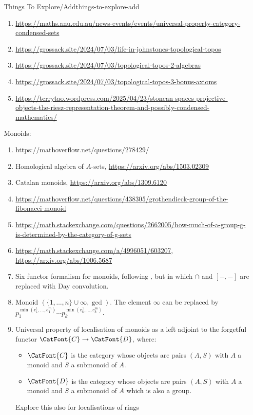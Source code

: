 \begin{remark}{Things To Explore/Add}{things-to-explore-add}
\begin{enumerate}
        \item \url{https://maths.anu.edu.au/news-events/events/universal-property-category-condensed-sets}
        \item \url{https://grossack.site/2024/07/03/life-in-johnstones-topological-topos}
        \item \url{https://grossack.site/2024/07/03/topological-topos-2-algebras}
        \item \url{https://grossack.site/2024/07/03/topological-topos-3-bonus-axioms}
        \item \url{https://terrytao.wordpress.com/2025/04/23/stonean-spaces-projective-objects-the-riesz-representation-theorem-and-possibly-condensed-mathematics/}
    \end{enumerate}
    Monoids:
    \begin{enumerate}
        \item \url{https://mathoverflow.net/questions/278429/}
        \item Homological algebra of $A$-sets, \url{https://arxiv.org/abs/1503.02309}
        \item Catalan monoids, \url{https://arxiv.org/abs/1309.6120}
        \item \url{https://mathoverflow.net/questions/438305/grothendieck-group-of-the-fibonacci-monoid}
        \item \url{https://math.stackexchange.com/questions/2662005/how-much-of-a-group-g-is-determined-by-the-category-of-g-sets}
        \item \url{https://math.stackexchange.com/a/4996051/603207}, \url{https://arxiv.org/abs/1006.5687}
        \item Six functor formalism for monoids, following , but in which $\cap$ and $[-,-]$ are replaced with Day convolution.
        \item Monoid $(\{1,\ldots,n\}\cup\infty,\gcd)$. The element $\infty$ can be replaced by $p^{\min(e^{1}_{1},\ldots,e^{m}_{1})}_{1}\cdots p^{\min(e^{1}_{k},\ldots,e^{m}_{k})}_{k}$.
        \item Universal property of localisation of monoids as a left adjoint to the forgetful functor $\CatFont{C}\to\CatFont{D}$, where:
            \begin{itemize}
                \item $\CatFont{C}$ is the category whose objects are pairs $(A,S)$ with $A$ a monoid and $S$ a submonoid of $A$.
                \item $\CatFont{D}$ is the category whose objects are pairs $(A,S)$ with $A$ a monoid and $S$ a submonoid of $A$ which is also a group.
            \end{itemize}
            Explore this also for localisations of rings


\end{enumerate}
\end{remark}
